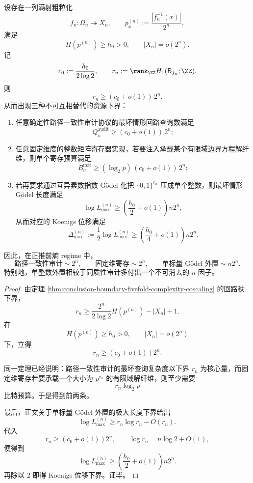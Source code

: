 \begin{theorem}\label{thm:conclusion-positive-pushforward-entropy-three-scale-law}
设存在一列满射粗粒化
\[
f_n:\Omega_n\twoheadrightarrow X_n,
\qquad
p_x^{(n)}:=\frac{|f_n^{-1}(x)|}{2^n},
\]
满足
\[
H(p^{(n)})\ge h_0>0,
\qquad
|X_n|=o(2^n).
\]
记
\[
c_0:=\frac{h_0}{2\log 2},
\qquad
r_n:=\rank_{\ZZ}H_1(\mathsf B_{f_n};\ZZ).
\]
则
\[
r_n\ge (c_0+o(1))\,2^n.
\]
从而出现三种不可互相替代的资源下界：
\begin{enumerate}
  \item 任意确定性路径一致性审计协议的最坏情形回路查询数满足
  \[
  Q_n^{\mathrm{audit}}\ge (c_0+o(1))\,2^n;
  \]
  \item 任意固定维度的整数矩阵寄存器实现，若要注入承载某个有限域边界方程解纤维，则单个寄存预算满足
  \[
  B_n^{\mathrm{mat}}\ge (\log_2 p)\,(c_0+o(1))\,2^n;
  \]
  \item 若再要求通过互异素数指数 Gödel 化把 \(\{0,1\}^{r_n}\) 压成单个整数，则最坏情形 Gödel 长度满足
  \[
  \log L_{\max}^{(n)}\ge \left(\frac{h_0}{2}+o(1)\right)n2^n,
  \]
  从而对应的 Koenigs 位移满足
  \[
  \Delta_{\max}^{(n)}:=\frac12\log L_{\max}^{(n)}
  \ge
  \left(\frac{h_0}{4}+o(1)\right)n2^n.
  \]
\end{enumerate}
因此，在正推前熵 regime 中，
\[
\text{路径一致性审计}\sim 2^n,
\qquad
\text{固定维寄存}\sim 2^n,
\qquad
\text{单标量 Gödel 外置}\sim n2^n.
\]
特别地，单整数外置相较于同质性审计多付出一个不可消去的 \(n\)-因子。
\end{theorem}
\begin{proof}
由定理 \ref{thm:conclusion-boundary-fivefold-complexity-coscaling} 的回路秩下界，
\[
r_n\ge \frac{2^n}{2\log 2}H(p^{(n)})-|X_n|+1.
\]
在
\[
H(p^{(n)})\ge h_0>0,
\qquad
|X_n|=o(2^n)
\]
下，立得
\[
r_n\ge (c_0+o(1))2^n.
\]

同一定理已经说明：路径一致性审计的最坏查询复杂度以下界 \(r_n\) 为核心量，而固定维寄存若要承载一个大小为 \(p^{r_n}\) 的有限域解纤维，则至少需要
\[
r_n\log_2 p
\]
比特预算。于是得到前两条。

最后，正文关于单标量 Gödel 外置的极大长度下界给出
\[
\log L_{\max}^{(n)}\ge r_n\log r_n-O(r_n).
\]
代入
\[
r_n\ge (c_0+o(1))2^n,
\qquad
\log r_n=n\log 2+O(1),
\]
便得到
\[
\log L_{\max}^{(n)}
\ge
\left(\frac{h_0}{2}+o(1)\right)n2^n.
\]
再除以 \(2\) 即得 Koenigs 位移下界。证毕。
\end{proof}

